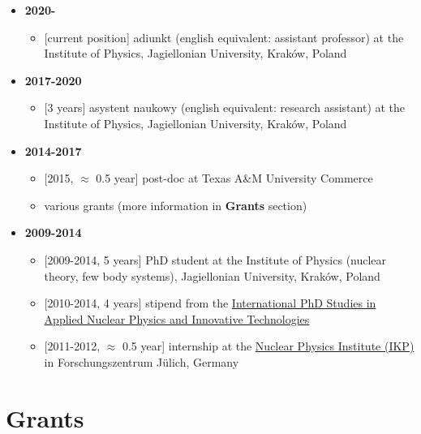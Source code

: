 \begin{itemize}
\tightlist
\item
  \textbf{2020-}

  \begin{itemize}
  \tightlist
  \item
    {[}current position{]} adiunkt (english equivalent: assistant
    professor) at the Institute of Physics, Jagiellonian University,
    Kraków, Poland
  \end{itemize}
\item
  \textbf{2017-2020}

  \begin{itemize}
  \tightlist
  \item
    {[}3 years{]} asystent naukowy (english equivalent: research
    assistant) at the Institute of Physics, Jagiellonian University,
    Kraków, Poland
  \end{itemize}
\item
  \textbf{2014-2017}

  \begin{itemize}
  \tightlist
  \item
    {[}2015, \(\approx\) 0.5 year{]} post-doc at Texas A\&M University
    Commerce
  \item
    various grants (more information in \textbf{Grants} section)
  \end{itemize}
\item
  \textbf{2009-2014}

  \begin{itemize}
  \tightlist
  \item
    {[}2009-2014, 5 years{]} PhD student at the Institute of Physics
    (nuclear theory, few body systems), Jagiellonian University, Kraków,
    Poland
  \item
    {[}2010-2014, 4 years{]} stipend from the
    \href{https://fais.uj.edu.pl/applied-nuclear-physics-and-innovative-technologies}{International
    PhD Studies in Applied Nuclear Physics and Innovative Technologies}
  \item
    {[}2011-2012, \(\approx\) 0.5 year{]} internship at the
    \href{https://www.fz-juelich.de/ikp/EN/Home/home_node.html}{Nuclear
    Physics Institute (IKP)} in Forschungszentrum Jülich, Germany
  \end{itemize}
\end{itemize}

\hypertarget{grants}{%
\section{Grants}\label{grants}}


